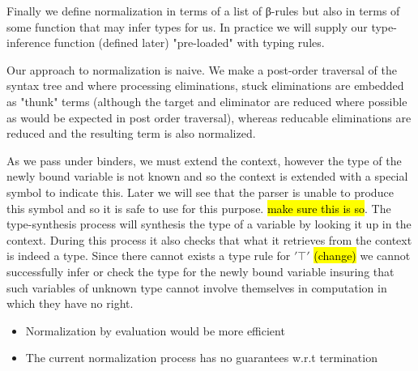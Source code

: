 Finally we define normalization in terms of a list of β-rules but also
in terms of some function that may infer types for us. In practice we will
supply our type-inference function (defined later) "pre-loaded" with typing
rules.

Our approach to normalization is naive. We make a post-order traversal of
the syntax tree and where processing eliminations, stuck eliminations are
embedded as "thunk" terms (although the target and eliminator are reduced
where possible as would be expected in post order traversal), whereas
reducable eliminations are reduced and the resulting term is also normalized.

As we pass under binders, we must extend the context, however the type of
the newly bound variable is not known and so the context is extended with
a special symbol to indicate this. Later we will see that the parser is
unable to produce this symbol and so it is safe to use for this purpose.
\hl{make sure this is so}. The type-synthesis process will synthesis the
type of a variable by looking it up in the context. During this process
it also checks that what it retrieves from the context is indeed a type.
Since there cannot exists a type rule for $'⊤'$ \hl{(change)} we cannot
successfully infer or check the type for the newly bound variable insuring
that such variables of unknown type cannot involve themselves in
computation in which they have no right.

\begin{itemize}
  \item Normalization by evaluation would be more efficient
  \item The current normalization process has no guarantees w.r.t
        termination
\end{itemize}

